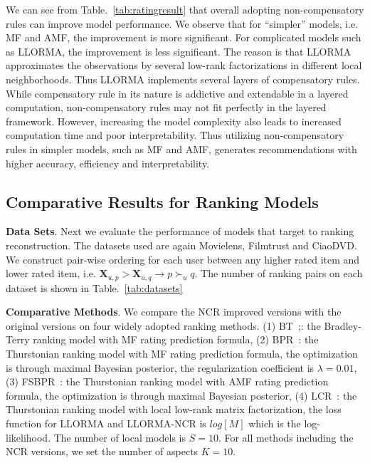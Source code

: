 \documentclass[letterpaper]{article} %
\newcommand{\Rating}{\mathbf{X}}
\begin{document}
We can see from Table.~\ref{tab:ratingresult} that overall adopting non-compensatory rules can improve model performance. We observe that for ``simpler'' models, i.e. MF and AMF,  the improvement is more significant. For complicated models such as LLORMA, the improvement is less significant. The reason is that LLORMA approximates the observations by several low-rank factorizations in different local neighborhoods.  Thus LLORMA implements several layers of compensatory rules. While compensatory rule in its nature is addictive and extendable in a layered computation, non-compensatory rules may not fit perfectly in the layered framework. However, increasing the model complexity also leads to increased computation time and poor interpretability. Thus utilizing non-compensatory rules in simpler models, such as MF and AMF, generates recommendations with higher accuracy, efficiency and interpretability. 


\subsection{Comparative Results for Ranking Models}

\textbf{Data Sets}. Next we evaluate the performance of models that target to ranking reconstruction. The datasets used are again Movielens, Filmtrust and CiaoDVD. We construct pair-wise ordering for each user between any higher rated item and lower rated item, i.e. $\Rating_{u,p}>\Rating_{u,q}\rightarrow p\succ_u q$. The number of ranking pairs on each dataset is shown in Table.~\ref{tab:datasets}

\textbf{Comparative Methods}. We compare the NCR improved versions with the original versions on four widely adopted ranking methods. (1) BT~\cite{Hu2016Improved};: the Bradley-Terry ranking model with MF rating prediction formula, (2) BPR~\cite{Rendle2009BPR}:  the Thurstonian ranking model with MF rating prediction formula, the optimization is through maximal Bayesian posterior, the regularization coefficient is $\lambda=0.01$, (3) FSBPR~\cite{Zhao2018Factored}: the Thurstonian ranking model with AMF rating prediction formula, the optimization is through maximal Bayesian posterior, (4) LCR~\cite{Lee2014Local}: the Thurstonian ranking model with local low-rank matrix factorization, the loss function for LLORMA and LLORMA-NCR is $log[M]$ which is the log-likelihood. The number of local models  is $S=10$.  For all methods including the NCR versions, we set the number of aspects $K=10$. 
\end{document}
